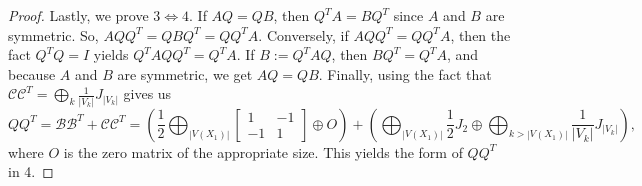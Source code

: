 \documentclass[10pt,a4paper]{amsart}
\begin{document}
\begin{proof}
Lastly, we prove $3\Leftrightarrow 4$.
If $AQ=QB$, then $Q^TA=BQ^T$ since $A$ and $B$ are symmetric. So, $AQQ^T=QBQ^T=QQ^TA$. Conversely, if $AQQ^T=QQ^TA$, then the fact $Q^TQ=I$ yields $Q^TAQQ^T=Q^TA$. If $B:=Q^TAQ$, then $BQ^T=Q^TA$, and because $A$ and $B$ are symmetric, we get $AQ=QB$. Finally, %
using the fact that $\mathcal{C}\mathcal{C}^T=\displaystyle\bigoplus_{k}\frac{1}{|V_k|}J_{|V_k|}$ gives us
\begin{equation*}
QQ^T%
=\mathcal{B}\mathcal{B}^T+\mathcal{C}\mathcal{C}^T=\left(\frac{1}{2}\bigoplus_{|V(X_1)|}\begin{bmatrix}1&-1\\-1&1\end{bmatrix}\oplus O\right)+\left(\bigoplus_{|V(X_1)|}\frac{1}{2}J_2\oplus \bigoplus_{k>|V(X_1)|} \frac{1}{|V_k|}J_{|V_k|}\right),
\end{equation*}
where $O$ is the zero matrix of the appropriate size. This yields the form of $QQ^T$ in 4.


\end{proof}
\end{document}
